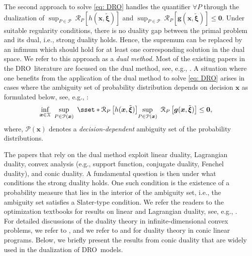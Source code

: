 \documentclass[final,onefignum,onetabnum]{class}
\newcommand{\rrisk}[2]{\Cs{R}_{#1} \left[ #2 \right]}
\newcommand{\bs}[1]{\boldsymbol{#1}} %
\newcommand{\Cs}[1]{\mathcal{#1}} %
\newcommand{\txi}{\tilde{\bs{\xi}}}
\newcommand{\dro}{DRO}
\begin{document}
The second approach  %
to solve \eqref{eq: DRO}  handles the quantifier $\forall P$ through the dualization of  $\sup_{P \in \Cs{P}} \ \rrisk{P}{h(\bs{x},\txi)}$ and $\sup_{P \in \Cs{P}} \ \rrisk{P}{\bs{g}(\bs{x},\txi)} \le \bs{0}$. %
Under suitable regularity conditions, there is no duality gap between the primal problem and its dual, i.e., strong duality holds. Hence, the supremum can be replaced by an infimum which should hold for at least one corresponding solution in the dual space. We refer  to this approach as a {\it dual method}. Most of the existing papers in the \dro\ literature are focused on the dual method, see, e.g.,  \citet{delage2010,bertsimas2010minmax,wiesemann2013,ben2013}. 
A situation where one benefits from the application  of the dual method to solve \eqref{eq: DRO} arises in cases where the ambiguity set of probability distribution depends on decision $\bs{x}$ as formulated  below, see, e.g., \citet{luo2018,noyan2018}: 
\begin{equation}
\label{eq: D3RO}
\inf_{\bs{x} \in \Cs{X} } \ \sup_{P \in \Cs{P}(\bs{x})} \ 	\sset*{\rrisk{P}{h(\bs{x},\txi)}}{\sup_{P \in \Cs{P}(\bs{x}) } \ \rrisk{P}{\bs{g}(\bs{x},\txi)} \le \bs{0}},
\end{equation}
where, $\Cs{P}(\bs{x})$ denotes a {\it decision-dependent} ambiguity set of the probability distributions. 

The papers that rely on the dual method exploit linear duality, Lagrangian duality, convex analysis (e.g., support function, conjugate duality, Fenchel duality), and conic duality. A fundamental question is then under what conditions the strong duality holds. One  such condition is the existence of a probability measure that lies in the interior of the ambiguity set, i.e., the ambiguity set satisfies a Slater-type condition.  We  refer the readers to the optimization textbooks for results on linear and Lagrangian duality, see, e.g., \citet{bazaraa2013NLP,bertsekas1999NLP,ruszczynski2006NLP,rockafellar1974duality}. For detailed discussions of the duality theory in infinite-dimensional convex problems, we refer to \citet{rockafellar1974duality}, and we refer to \citet{isii1962} and \citet{shapiro2001duality} for duality theory in conic linear programs.
Below, we briefly present the results from conic duality %
that are widely used in the dualization of \dro\ models. 
\end{document}
